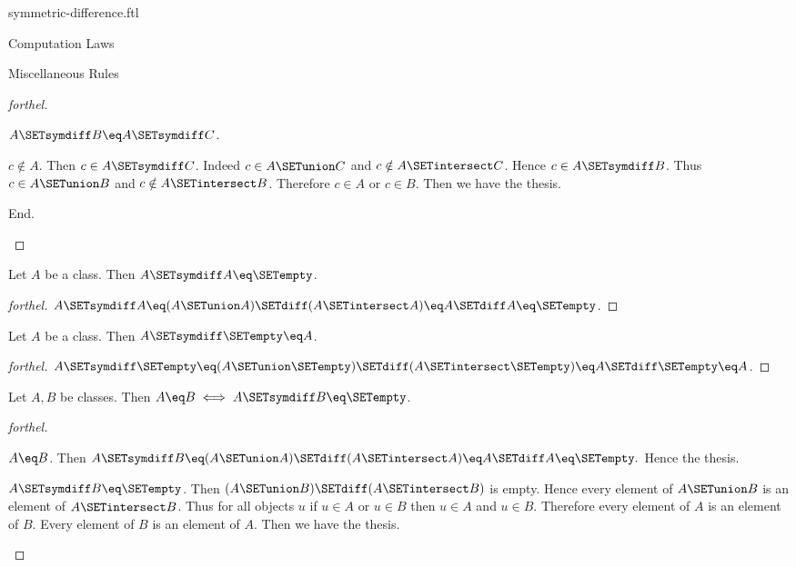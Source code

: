 \documentclass{naproche-library}
\begin{document}
\begin{smodule}[title=Symmetric Difference]{symmetric-difference.ftl}
\begin{sfragment}{Computation Laws}
\begin{sfragment}{Miscellaneous Rules}
\begin{proof}[forthel]
\begin{case}{$A \SETsymdiff B \eq A \SETsymdiff C$.}
          \begin{case}{$c \notin A$.}
            Then $c \in A \SETsymdiff C$.
            Indeed $c \in A \SETunion C$ and $c \notin A \SETintersect C$.
            Hence $c \in A \SETsymdiff B$.
            Thus $c \in A \SETunion B$ and $c \notin A \SETintersect B$.
            Therefore $c \in A$ or $c \in B$.
            Then we have the thesis.
          \end{case}
        End.
      \end{case}
    \end{proof}

    \begin{proposition}[forthel,id=FOUNDATIONS_03_4578696040022016]
      Let $A$ be a class.
      Then $A \SETsymdiff A \eq \SETempty$.
    \end{proposition}
    \begin{proof}[forthel]
      $A \SETsymdiff A
        \eq (A \SETunion A) \SETdiff (A \SETintersect A)
        \eq A \SETdiff A
        \eq \SETempty$.
    \end{proof}

    \begin{proposition}[forthel,id=FOUNDATIONS_03_6698730398941184]
      Let $A$ be a class.
      Then $A \SETsymdiff \SETempty \eq A$.
    \end{proposition}
    \begin{proof}[forthel]
      $A \SETsymdiff \SETempty
        \eq (A \SETunion \SETempty) \SETdiff (A \SETintersect \SETempty)
        \eq A \SETdiff \SETempty
        \eq A$.
    \end{proof}

    \begin{proposition}[forthel,id=FOUNDATIONS_03_6111806917443584]
      Let $A, B$ be classes.
      Then $A \eq B \iff A \SETsymdiff B \eq \SETempty$.
    \end{proposition}
    \begin{proof}[forthel]
      \begin{case}{$A \eq B$.}
        Then $A \SETsymdiff B
          \eq (A \SETunion A) \SETdiff (A \SETintersect A)
          \eq A \SETdiff A
          \eq \SETempty.$
        Hence the thesis.
      \end{case}

      \begin{case}{$A \SETsymdiff B \eq \SETempty$.}
        Then $(A \SETunion B) \SETdiff (A \SETintersect B)$ is empty.
        Hence every element of $A \SETunion B$ is an element of $A \SETintersect B$.
        Thus for all objects $u$ if $u \in A$ or $u \in B$ then $u \in A$ and $u \in B$.
        Therefore every element of $A$ is an element of $B$.
        Every element of $B$ is an element of $A$.
        Then we have the thesis.
      \end{case}
    \end{proof}
  \end{sfragment}
\end{sfragment}
\end{smodule}
\end{document}
